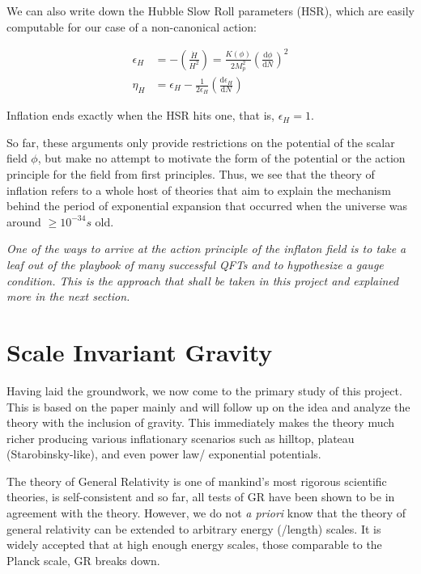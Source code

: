 \documentclass[aps,prd,reprint,preprintnumbers,showpacs,floatfix,nofootinbib,superscript address]{revtex4-2}
\begin{document}
We can also write down the Hubble Slow Roll parameters (HSR), which are easily computable for our case of a non-canonical action:

\begin{align}
    \epsilon_H &= -  \left( \frac{\dot{H}}{H^2} \right) = \frac{K(\phi)}{2 M_p^2} \left( \frac{\text{d}\phi}{\text{d}N} \right)^2  \nonumber \\
    \eta_H &= \epsilon_H - \frac{1}{2 \epsilon_H} \left( \frac{\text{d}\epsilon_H}{\text{d}N} \right)
\end{align}

Inflation ends exactly when the HSR hits one, that is, $\epsilon_H = 1$.

So far, these arguments only provide restrictions on the potential of the scalar field $\phi$, but make no attempt to motivate the form of the potential or the action principle for the field from first principles. Thus, we see that the theory of inflation refers to a whole host of theories that aim to explain the mechanism behind the period of exponential expansion that occurred when the universe was around $\geq 10^{-34}s$ old.

\textit{One of the ways to arrive at the action principle of the inflaton field is to take a leaf out of the playbook of many successful QFTs and to hypothesize a gauge condition. This is the approach that shall be taken in this project and explained more in the next section.}


\section{Scale Invariant Gravity} \label{Section 3}
Having laid the groundwork, we now come to the primary study of this project. This is based on the paper \cite{barker2024poincaregaugetheoryconformal} mainly and will follow up on the idea and analyze the theory with the inclusion of gravity. This immediately makes the theory much richer producing various inflationary scenarios such as hilltop, plateau (Starobinsky-like), and even power law/ exponential potentials.

The theory of General Relativity is one of mankind's most rigorous scientific theories, is self-consistent and so far, all tests of GR have been shown to be in agreement with the theory. However, we do not \textit{a priori} know that the theory of general relativity can be extended to arbitrary energy (/length) scales. It is widely accepted that at high enough energy scales, those comparable to the Planck scale, GR breaks down. 
\end{document}
